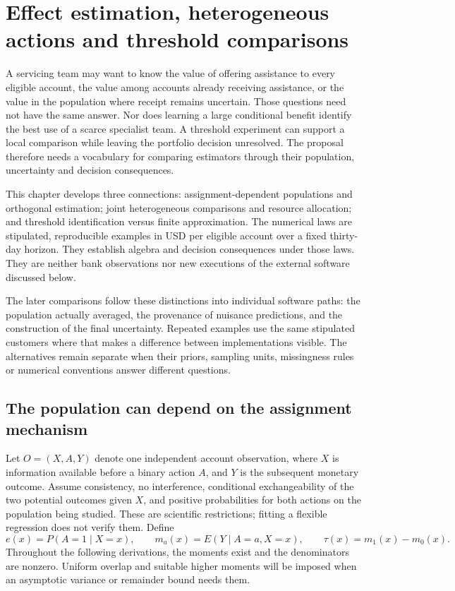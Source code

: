 \chapter{Effect estimation, heterogeneous actions and threshold comparisons}
\label{exec17:s4}

A servicing team may want to know the value of offering assistance to every
eligible account, the value among accounts already receiving assistance, or
the value in the population where receipt remains uncertain. Those questions
need not have the same answer. Nor does learning a large conditional benefit
identify the best use of a scarce specialist team. A threshold experiment can
support a local comparison while leaving the portfolio decision unresolved.
The proposal therefore needs a vocabulary for comparing estimators through
their population, uncertainty and decision consequences.

This chapter develops three connections: assignment-dependent populations and
orthogonal estimation; joint heterogeneous comparisons and resource allocation;
and threshold identification versus finite approximation. The numerical laws
are stipulated, reproducible examples in USD per eligible account over a fixed
thirty-day horizon. They establish algebra and decision consequences under
those laws. They are neither bank observations nor new executions of the
external software discussed below.~\citep{exec17_s4_math}

The later comparisons follow these distinctions into individual software
paths: the population actually averaged, the provenance of nuisance predictions,
and the construction of the final uncertainty. Repeated examples use the same
stipulated customers where that makes a difference between implementations
visible. The alternatives remain separate when their priors, sampling units,
missingness rules or numerical conventions answer different questions.

\section{The population can depend on the assignment mechanism}
\label{exec17:s4-target}

Let $O=(X,A,Y)$ denote one independent account observation, where $X$ is
information available before a binary action $A$, and $Y$ is the subsequent
monetary outcome. Assume consistency, no interference, conditional
exchangeability of the two potential outcomes given $X$, and positive
probabilities for both actions on the population being studied. These are
scientific restrictions; fitting a flexible regression does not verify them.
Define
\[
 e(x)=P(A=1\mid X=x),\qquad m_a(x)=E(Y\mid A=a,X=x),\qquad
 \tau(x)=m_1(x)-m_0(x).
\]
Throughout the following derivations, the moments exist and the denominators
are nonzero. Uniform overlap and suitable higher moments will be imposed when
an asymptotic variance or remainder bound needs them.

